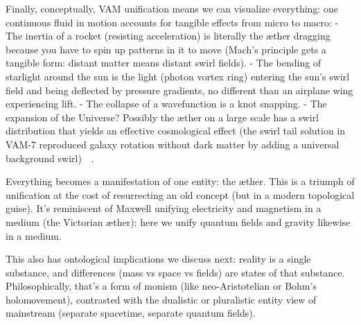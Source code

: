 \documentclass[a4paper,12pt]{article}
\begin{document}
    Finally, conceptually, VAM unification means we can visualize everything: one continuous fluid in motion accounts for tangible effects from micro to macro:
    - The inertia of a rocket (resisting acceleration) is literally the æther dragging because you have to spin up patterns in it to move (Mach’s principle gets a tangible form: distant matter means distant swirl fields).
    - The bending of starlight around the sun is the light (photon vortex ring) entering the sun’s swirl field and being deflected by pressure gradients, no different than an airplane wing experiencing lift.
    - The collapse of a wavefunction is a knot snapping.
    - The expansion of the Universe? Possibly the æther on a large scale has a swirl distribution that yields an effective cosmological effect (the swirl tail solution in VAM-7 reproduced galaxy rotation without dark matter by adding a universal background swirl)~\cite{reference_166}~\cite{reference_167}.

    Everything becomes a manifestation of one entity: the æther. This is a triumph of unification at the cost of resurrecting an old concept (but in a modern topological guise). It’s reminiscent of Maxwell unifying electricity and magnetism in a medium (the Victorian æther); here we unify quantum fields and gravity likewise in a medium.

    This also has ontological implications we discuss next: reality is a single substance, and differences (mass vs space vs fields) are states of that substance. Philosophically, that’s a form of monism (like neo-Aristotelian or Bohm’s holomovement), contrasted with the dualistic or pluralistic entity view of mainstream (separate spacetime, separate quantum fields).
\end{document}
